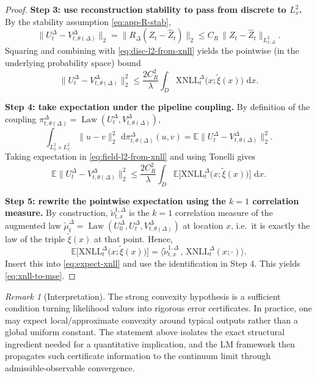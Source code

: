 \documentclass{article}
\numberwithin{equation}{section}
\theoremstyle{plain}
\theoremstyle{definition}
\theoremstyle{remark}
\newtheorem{remark}[theorem]{Remark}
\newcommand{\E}{\mathbb{E}}
\newcommand{\dd}{\,\mathrm{d}}
\DeclareMathOperator{\Law}{Law}
\begin{document}
\begin{proof}
\smallskip
\noindent\textbf{Step 3: use reconstruction stability to pass from discrete to $L^2_x$.}
By the stability assumption \eqref{eq:app-R-stab},
\[
\|U_t^\Delta - V_{t,\theta(\Delta)}^\Delta\|_{2}
=
\|R_\Delta(Z_t-\widehat Z_t)\|_{2}
\le C_R\,\|Z_t-\widehat Z_t\|_{L^2_{x,\Delta}}.
\]
Squaring and combining with \eqref{eq:disc-l2-from-xnll} yields the pointwise (in the underlying probability space) bound
\begin{equation}\label{eq:field-l2-from-xnll}
\|U_t^\Delta - V_{t,\theta(\Delta)}^\Delta\|_{2}^2
\le \frac{2C_R^2}{\lambda}\int_D \mathrm{XNLL}^\Delta_t\!\bigl(x;\widetilde\xi(x)\bigr)\,\dd x.
\end{equation}

\smallskip
\noindent\textbf{Step 4: take expectation under the pipeline coupling.}
By definition of the coupling $\pi^\Delta_{t,\theta(\Delta)}=\Law(U_t^\Delta,V_{t,\theta(\Delta)}^\Delta)$,
\[
\int_{L^2_x\times L^2_x}\|u-v\|_2^2\,\dd\pi^\Delta_{t,\theta(\Delta)}(u,v)
=
\E\|U_t^\Delta - V_{t,\theta(\Delta)}^\Delta\|_2^2.
\]
Taking expectation in \eqref{eq:field-l2-from-xnll} and using Tonelli gives
\begin{equation}\label{eq:expect-xnll}
\E\|U_t^\Delta - V_{t,\theta(\Delta)}^\Delta\|_{2}^2
\le \frac{2C_R^2}{\lambda}\int_D \E\Big[\mathrm{XNLL}^\Delta_t\!\bigl(x;\widetilde\xi(x)\bigr)\Big]\,\dd x.
\end{equation}

\smallskip
\noindent\textbf{Step 5: rewrite the pointwise expectation using the $k=1$ correlation measure.}
By construction, $\widetilde\nu^{1,\Delta}_{t,x}$ is the $k=1$ correlation measure of the augmented law
$\widetilde\mu_t^\Delta=\Law(U_0^\Delta,U_t^\Delta,V_{t,\theta(\Delta)}^\Delta)$ at location $x$, i.e.\ it is exactly the law
of the triple $\widetilde\xi(x)$ at that point. Hence,
\[
\E\Big[\mathrm{XNLL}^\Delta_t\!\bigl(x;\widetilde\xi(x)\bigr)\Big]
=
\Big\langle \widetilde\nu^{1,\Delta}_{t,x}\,,\,\mathrm{XNLL}^\Delta_t(x;\cdot)\Big\rangle.
\]
Insert this into \eqref{eq:expect-xnll} and use the identification in Step 4. This yields \eqref{eq:xnll-to-mse}.
\end{proof}


\begin{remark}[Interpretation]
The strong convexity hypothesis is a sufficient condition turning likelihood values into rigorous error certificates.
In practice, one may expect local/approximate convexity around typical outputs rather than a global uniform constant.
The statement above isolates the exact structural ingredient needed for a quantitative implication, and the LM framework
then propagates such certificate information to the continuum limit through admissible-observable convergence.
\end{remark}
\end{document}
